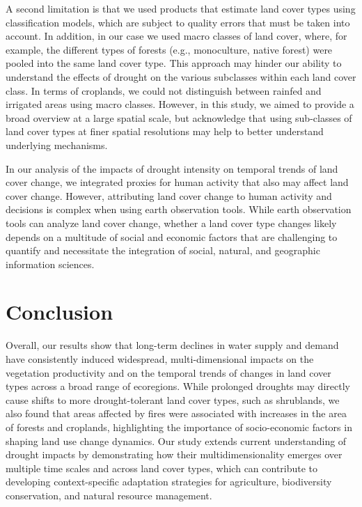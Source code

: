 \documentclass[
  sn-nature,
  numbered]{sn-jnl}
\begin{document}
A second limitation is that we used products that estimate land cover
types using classification models, which are subject to quality errors
that must be taken into account\citep{Stehman2019, Verburg2011}. In
addition, in our case we used macro classes of land cover, where, for
example, the different types of forests (e.g., monoculture, native
forest) were pooled into the same land cover type. This approach may
hinder our ability to understand the effects of drought on the various
subclasses within each land cover class. In terms of croplands, we could
not distinguish between rainfed and irrigated areas using macro classes.
However, in this study, we aimed to provide a broad overview at a large
spatial scale, but acknowledge that using sub-classes of land cover
types at finer spatial resolutions may help to better understand
underlying mechanisms.

In our analysis of the impacts of drought intensity on temporal trends
of land cover change, we integrated proxies for human activity that also
may affect land cover change. However, attributing land cover change to
human activity and decisions is complex when using earth observation
tools. While earth observation tools can analyze land cover change,
whether a land cover type changes likely depends on a multitude of
social and economic factors that are challenging to
quantify\citep{Rindfuss2004, Jenner2024} and necessitate the integration
of social, natural, and geographic information sciences.

\section{Conclusion}\label{conclusion}

Overall, our results show that long-term declines in water supply and
demand have consistently induced widespread, multi-dimensional impacts
on the vegetation productivity and on the temporal trends of changes in
land cover types across a broad range of ecoregions. While prolonged
droughts may directly cause shifts to more drought-tolerant land cover
types, such as shrublands, we also found that areas affected by fires
were associated with increases in the area of forests and croplands,
highlighting the importance of socio-economic factors in shaping land
use change dynamics. Our study extends current understanding of drought
impacts by demonstrating how their multidimensionality emerges over
multiple time scales and across land cover types, which can contribute
to developing context-specific adaptation strategies for agriculture,
biodiversity conservation, and natural resource management.
\end{document}

